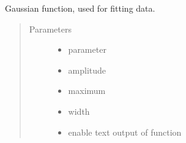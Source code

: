 \documentclass[letterpaper,10pt,english]{sphinxmanual}
\begin{document}
\begin{fulllineitems}
\label{\detokenize{fit-functions:fit_functions.gauss}}
Gaussian function, used for fitting data.
\begin{quote}\begin{description}
\item[{Parameters}] \leavevmode\begin{itemize}
\item {} 
 \textendash{} parameter

\item {} 
 \textendash{} amplitude

\item {} 
 \textendash{} maximum

\item {} 
 \textendash{} width

\item {} 
 \textendash{} enable text output of function

\end{itemize}

\end{description}\end{quote}

\end{fulllineitems}

\end{document}
